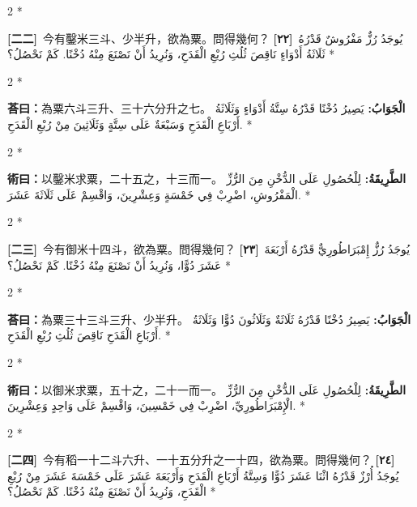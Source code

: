 \documentclass[11pt,a4paper]{article}
\newcommand{\ar}[1]{\arabicfont\beginR #1\endR}
\newcommand{\problemnum}[1]{\textbf{[\ignorespaces#1\unskip]}}
\newenvironment{bilingual}{%
  \begin{paracol}{2}%
  \switchcolumn[0]*%
}{%
  \end{paracol}%
}
\newcommand{\cnline}[1]{\switchcolumn[0]\noindent #1 \switchcolumn[1]}
\newcommand{\arline}[1]{\noindent\ar{#1} \switchcolumn[0]*}
\newenvironment{prob bilingual}{%
  \begin{paracol}{2}%
  \switchcolumn[0]*%
}{%
  \end{paracol}%
  \vspace{0.3em}%
}
\begin{document}
\begin{bilingual}
\cnline{\problemnum{二二}\, 今有鑿米三斗、少半升，欲為粟。問得幾何？}
\arline{\problemnum{٢٢}\, يُوجَدُ رُزٌّ مَفْرُوشٌ قَدْرُهُ ثَلَاثَةُ أَدْوَاءٍ نَاقِصَ ثُلُثِ رُبْعِ الْقَدَحِ، وَنُرِيدُ أَنْ نَصْنَعَ مِنْهُ دُخْنًا. كَمْ نَحْصُلُ؟}
\end{bilingual}

\begin{bilingual}
\cnline{\textcolor{answercolor}{\textbf{荅曰：}}為粟六斗三升、三十六分升之七。}
\arline{\textcolor{answercolor}{\textbf{الْجَوَابُ:}} يَصِيرُ دُخْنًا قَدْرُهُ سِتَّةُ أَدْوَاءٍ وَثَلَاثَةُ أَرْبَاعِ الْقَدَحِ وَسَبْعَةٌ عَلَى سِتَّةٍ وَثَلَاثِينَ مِنْ رُبْعِ الْقَدَحِ.}
\end{bilingual}

\begin{bilingual}
\cnline{%
\textcolor{methodcolor}{\textbf{術曰：}}以鑿米求粟，二十五之，十三而一。
}
\arline{%
\textcolor{methodcolor}{\textbf{الطَّرِيقَةُ:}} لِلْحُصُولِ عَلَى الدُّخْنِ مِنَ الرُّزِّ الْمَفْرُوشِ، اضْرِبْ فِي خَمْسَةٍ وَعِشْرِينَ، وَاقْسِمْ عَلَى ثَلَاثَةَ عَشَرَ.
}
\end{bilingual}

\begin{bilingual}
\cnline{\problemnum{二三}\, 今有御米十四斗，欲為粟。問得幾何？}
\arline{\problemnum{٢٣}\, يُوجَدُ رُزٌّ إِمْبَرَاطُورِيٌّ قَدْرُهُ أَرْبَعَةَ عَشَرَ دُوًّا، وَنُرِيدُ أَنْ نَصْنَعَ مِنْهُ دُخْنًا. كَمْ نَحْصُلُ؟}
\end{bilingual}

\begin{bilingual}
\cnline{\textcolor{answercolor}{\textbf{荅曰：}}為粟三十三斗三升、少半升。}
\arline{\textcolor{answercolor}{\textbf{الْجَوَابُ:}} يَصِيرُ دُخْنًا قَدْرُهُ ثَلَاثَةٌ وَثَلَاثُونَ دُوًّا وَثَلَاثَةُ أَرْبَاعِ الْقَدَحِ نَاقِصَ ثُلُثِ رُبْعِ الْقَدَحِ.}
\end{bilingual}

\begin{bilingual}
\cnline{%
\textcolor{methodcolor}{\textbf{術曰：}}以御米求粟，五十之，二十一而一。
}
\arline{%
\textcolor{methodcolor}{\textbf{الطَّرِيقَةُ:}} لِلْحُصُولِ عَلَى الدُّخْنِ مِنَ الرُّزِّ الْإِمْبَرَاطُورِيِّ، اضْرِبْ فِي خَمْسِينَ، وَاقْسِمْ عَلَى وَاحِدٍ وَعِشْرِينَ.
}
\end{bilingual}


\begin{bilingual}
\cnline{\problemnum{二四}\, 今有稻一十二斗六升、一十五分升之一十四，欲為粟。問得幾何？}
\arline{\problemnum{٢٤}\, يُوجَدُ أُرْزٌ قَدْرُهُ اثْنَا عَشَرَ دُوًّا وَسِتَّةُ أَرْبَاعِ الْقَدَحِ وَأَرْبَعَةَ عَشَرَ عَلَى خَمْسَةَ عَشَرَ مِنْ رُبْعِ الْقَدَحِ، وَنُرِيدُ أَنْ نَصْنَعَ مِنْهُ دُخْنًا. كَمْ نَحْصُلُ؟}
\end{bilingual}
\end{document}
